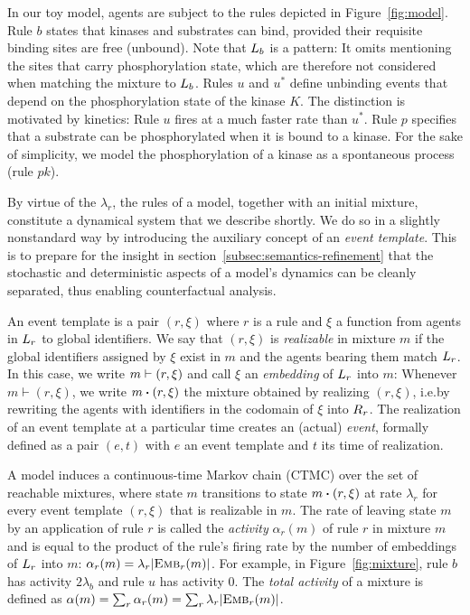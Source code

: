 

In our toy model, agents are subject to the rules depicted in
Figure~\ref{fig:model}. Rule $b$ states that kinases and substrates
can bind, provided their requisite binding sites are free
(unbound). Note that $L_{b}$ is a pattern: It omits mentioning the
sites that carry phosphorylation state, which are therefore not
considered when matching the mixture to $L_{b}$. Rules $u$ and
$u^{*}$ define unbinding events that depend on the phosphorylation
state of the kinase $K$. The distinction is motivated by kinetics:
Rule $u$ fires at a much faster rate than $u^{*}$. Rule $p$ specifies
that a substrate can be phosphorylated when it is bound to a
kinase. For the sake of simplicity, we model the phosphorylation of a
kinase as a spontaneous process (rule $pk$).

By virtue of the $\lambda_r$, the rules of a model, together with an
initial mixture, constitute a dynamical system that we describe
shortly. We do so in a slightly nonstandard way by introducing the
auxiliary concept of an \emph{event template}. This is to prepare for
the insight in section~\ref{subsec:semantics-refinement} that the
stochastic and deterministic aspects of a model's dynamics can be
cleanly separated, thus enabling counterfactual analysis.

An event template is a pair $(r, \xi)$ where $r$ is a rule and $\xi$ a
function from agents in $L_{r}$ to global identifiers. We say that
$(r, \xi)$ is \emph{realizable} in mixture $m$ if the global
identifiers assigned by $\xi$ exist in $m$ and the agents bearing them
match $L_{r}$. In this case, we write $m \vdash (r, \xi)$
and call $\xi$ an \emph{embedding} of
$L_{r}$ into $m$:
  Whenever $m \vdash (r, \xi)$, we
write $\UPDATE{m}{(r, \xi)}$ the mixture obtained by
realizing $(r, \xi)$, i.e.\@ by rewriting the agents with identifiers
in the codomain of $\xi$ into $R_{r}$. The realization of an event
template at a particular time creates an (actual) \emph{event},
formally defined as a pair $(e, t)$ with $e$ an event template and $t$
its time of realization.

A model induces a continuous-time Markov chain (CTMC) over the
set of reachable mixtures, where state $m$ transitions to state
$\UPDATE{m}{(r, \xi)}$ at rate $\lambda_r$ for every event template
$(r, \xi)$ that is realizable in $m$. The rate of leaving state $m$ by
an application of rule $r$ is called the \emph{activity} $\alpha_r(m)$
of rule $r$ in
mixture $m$ and is equal to the product of the rule's firing rate by
the number of embeddings of $L_{r}$ into $m$:
$\alpha_r(m)=\lambda_r|{\textsc{Emb}}_{r}(m)|$. For example, in
Figure~\ref{fig:mixture}, rule $b$ has activity $2\lambda_b$ and rule
$u$ has activity $0$. The \emph{total activity} of a mixture is defined
as $\alpha(m)=\sum_r\alpha_r(m)=\sum_r\lambda_r|{\textsc{Emb}}_{r}(m)|$.


